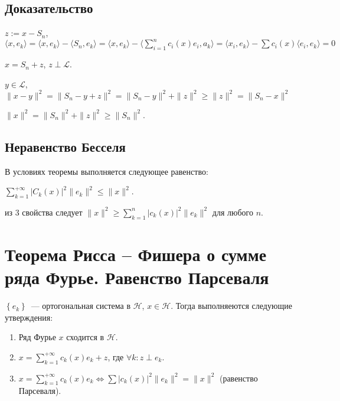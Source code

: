 \documentclass{article}
\begin{document}
        \subsection{Доказательство}
        
            $z := x - S_n$, $\langle x, e_k \rangle = \langle x, e_k \rangle - \langle S_n, e_k \rangle = \langle x, e_k \rangle - \langle \sum\limits_{i = 1}^n c_i(x)e_i, a_k \rangle = \langle x_i, e_k \rangle - \sum c_i(x) \langle e_i, e_k \rangle = 0$
            
            $x = S_n + z$, $z \perp \mathcal{L}$.
            
            $y \in \mathcal{L}$, $\| x - y \|^2 = \| S_n - y + z \|^2 = \| S_n - y \|^2 + \| z \|^2 \geqslant \| z \|^2 = \| S_n - x \|^2$
            
            $\| x \|^2 = \| S_n \|^2 + \| z \|^2 \geqslant \| S_n \|^2$.
            
        \subsection{Неравенство Бесселя}
        
            В условиях теоремы выполняется следующее равенство:
            
            $\sum\limits_{k = 1}^{+\infty} \left| C_k(x) \right|^2 \| e_k \|^2 \leqslant \| x \|^2$.
            
            из 3 свойства следует $\| x \|^2 \geqslant \sum\limits_{k = 1}^n \left| c_k(x) \right|^2 \| e_k \|^2$ для любого $n$.
        
    \newpage
    
    \section{Теорема Рисса -- Фишера о сумме ряда Фурье. Равенство Парсеваля}
    
        $\left\{ e_k \right\}$~--- ортогональная система в $\mathcal{H}$, $x \in \mathcal{H}$. Тогда выполняеются следующие утверждения:
        
        \begin{enumerate}
        
            \item Ряд Фурье $x$ сходится в $\mathcal{H}$.
            
            \item $x = \sum\limits^{+\infty}_{k = 1} c_k(x) e_k + z$, где $\forall k : z \perp e_k$.
            
            \item $x = \sum\limits_{k = 1}^{+\infty} c_k(x) e_k \Longleftrightarrow \sum \left| c_k(x) \right|^2 \| e_k \|^2 = \| x \|^2$ (равенство Парсеваля).
            
        \end{enumerate}
            
\end{document}
